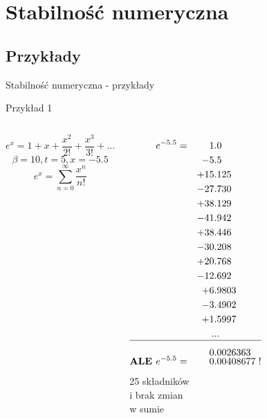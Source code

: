 \section{Stabilność numeryczna}
\subsection{Przykłady}
\begin{frame}{Stabilność numeryczna - przykłady}
	\begin{exampleblock}{Przykład 1}
    \fontsize{9}{9}
      \begin{columns}[T]
        \vspace{.5cm}
            \[
                e^x = 1 + x + \frac{x^2}{2!} + \frac{x^3}{3!} + ...
            \]\[
                \beta = 10, t = 5, x = -5.5
            \]\newline
            \[
            	e^{x}=\sum_{n=0}^{\infty}\frac{x^{n}}{n!}
            \]
          \begin{columns}
                  \begin{align*}
                      e^{-5.5}  	=& &   1&.0 \\
                                   & &  -5&.5 \\
                                   & & +15&.125 \\
                                   & & -27&.730 \\
                                   & & +38&.129 \\
                                   & & -41&.942 \\
                                   & & +38&.446 \\
                                   & & -30&.208 \\
                                   & & +20&.768 \\
                                   & & -12&.692 \\
                                   & &  +6&.9803 \\
                                   & &  -3&.4902 \\
                                   & &  +1&.5997 \\
                                   & & .&..\\
                                   \hline \\[-8pt]
                                   & &   0&.0026363
                  \\[-7pt]
                  \text{\bf ALE  } e^{-5.5} =& & 0&.00408677 \hspace{3pt} !
                  \end{align*}
                  25 składników \\i brak zmian \\w sumie
          \end{columns}
      \end{columns}
	\end{exampleblock}
\end{frame}
